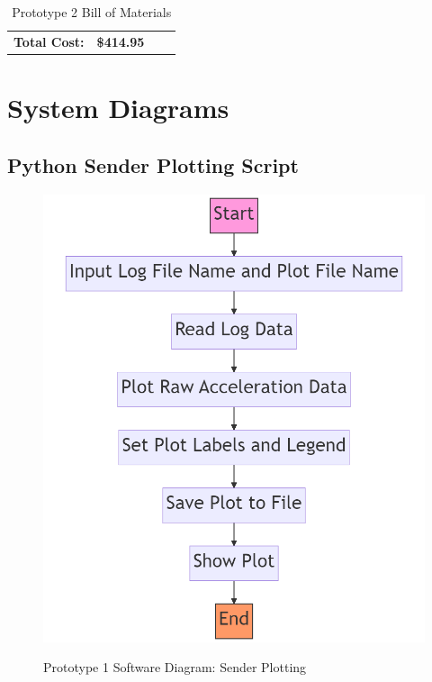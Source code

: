 \begin{table}[H]
\begin{tabular}{|cc|c|cc}
\multicolumn{2}{|c|}{\textbf{Total Cost:}}                                                                                                       & \textbf{\$414.95}   &                                                                                      &                                                                                                                              \\ \cline{1-3}
\end{tabular}
\caption{Prototype 2 Bill of Materials}
\label{proto2-bom}
\end{table}

\section{System Diagrams}
\subsection{Python Sender Plotting Script}
\begin{figure}[H]
	\centering
	\caption{Prototype 1 Software Diagram: Sender Plotting}
	\includegraphics[width=\textwidth]{Sections/Design-Process/proto1-soft-diagram-sender-plot.png}
	\label{proto1-soft-diagram-sender-plot}
\end{figure}

